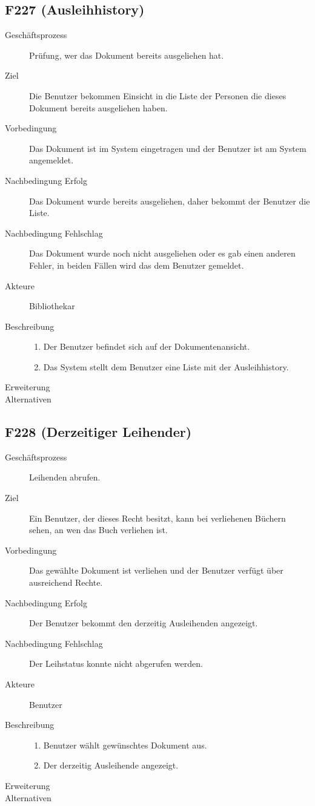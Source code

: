 \subsection{F227 (Ausleihhistory)}
\begin{description}
  \item[Geschäftsprozess]Prüfung, wer das Dokument bereits ausgeliehen hat.
  \item[Ziel]Die Benutzer bekommen Einsicht in die Liste der Personen die dieses Dokument bereits ausgeliehen haben.
  \item[Vorbedingung]Das Dokument ist im System eingetragen und der Benutzer ist am System angemeldet.
  \item[Nachbedingung Erfolg]Das Dokument wurde bereits ausgeliehen, daher bekommt der Benutzer die Liste.
  \item[Nachbedingung Fehlschlag]Das Dokument wurde noch nicht ausgeliehen oder es gab einen anderen Fehler, in beiden Fällen wird das dem Benutzer gemeldet.
  \item[Akteure]Bibliothekar
  \item[Beschreibung]\hfill
    \begin{enumerate}
      \item Der Benutzer befindet sich auf der Dokumentenansicht.
      \item Das System stellt dem Benutzer eine Liste mit der Ausleihhistory.
    \end{enumerate}
  \item[Erweiterung]
  \item[Alternativen]
\end{description}

\subsection{F228 (Derzeitiger Leihender)}
\begin{description}
  \item[Geschäftsprozess]Leihenden abrufen.
  \item[Ziel]Ein Benutzer, der dieses Recht besitzt, kann bei verliehenen Büchern sehen, an wen das Buch verliehen ist.
  \item[Vorbedingung]Das gewählte Dokument ist verliehen und der Benutzer verfügt über ausreichend Rechte.
  \item[Nachbedingung Erfolg]Der Benutzer bekommt den derzeitig Ausleihenden angezeigt.
  \item[Nachbedingung Fehlschlag]Der Leihstatus konnte nicht abgerufen werden.
  \item[Akteure]Benutzer 
  \item[Beschreibung]\hfill
  \begin{enumerate}
  \item Benutzer wählt gewünschtes Dokument aus.
  \item Der derzeitig Ausleihende angezeigt.
  \end{enumerate}
  \item[Erweiterung]
  \item[Alternativen]
\end{description}

